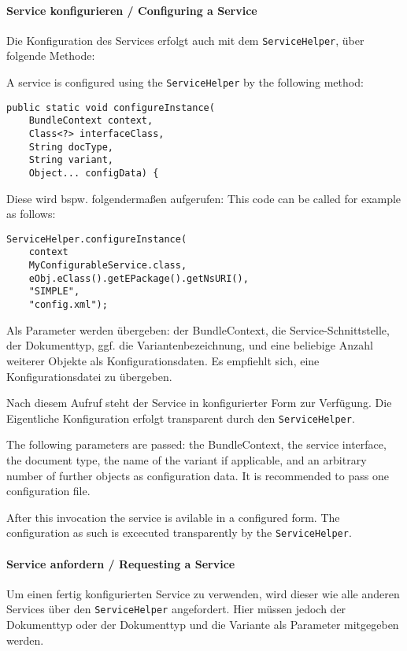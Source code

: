 \documentclass[10pt,a4paper]{scrartcl}
\providecommand{\deng}[2]{#1 / {\sffamily #2}}
\providecommand{\deutsch}[1]{#1}
\providecommand{\englisch}[1]{{\sffamily #1}}
\begin{document}
\paragraph{\deng{Service konfigurieren}{Configuring a Service}}
\deutsch{Die Konfiguration des Services erfolgt auch mit dem \texttt{ServiceHelper}, über folgende
Methode:}

\englisch{A service is configured using the \texttt{ServiceHelper} by the following method:}
\begin{lstlisting}
public static void configureInstance(
	BundleContext context, 
	Class<?> interfaceClass, 
	String docType, 
	String variant, 
	Object... configData) {
\end{lstlisting}

\deutsch{Diese wird bspw. folgendermaßen aufgerufen:}
\englisch{This code can be called for example as follows:}

\begin{lstlisting}
ServiceHelper.configureInstance(
	context
	MyConfigurableService.class, 
	eObj.eClass().getEPackage().getNsURI(),
	"SIMPLE", 
    "config.xml");
\end{lstlisting}

\deutsch{Als Parameter werden übergeben: der BundleContext, die Service-Schnittstelle, der Dokumenttyp, ggf.
die Variantenbezeichnung, und eine beliebige Anzahl weiterer Objekte als Konfigurationsdaten.
Es empfiehlt sich, eine Konfigurationsdatei zu übergeben.

Nach diesem Aufruf steht der Service in konfigurierter Form zur Verfügung. Die Eigentliche
Konfiguration erfolgt transparent durch den \texttt{ServiceHelper}.}

\englisch{The following parameters are passed: the BundleContext, the service interface, the document type, the name of the variant if applicable, and an arbitrary number of further objects as configuration data. It is recommended to pass one configuration file.

After this invocation the service is avilable in a configured form. The configuration as such is excecuted transparently by the \texttt{ServiceHelper}.}


\paragraph{\deng{Service anfordern}{Requesting a Service}}
\deutsch{Um einen fertig konfigurierten Service zu verwenden, wird dieser wie alle
anderen Services über den \texttt{ServiceHelper} angefordert. Hier müssen jedoch
der Dokumenttyp oder der Dokumenttyp und die Variante als Parameter mitgegeben
werden.}
\end{document}
